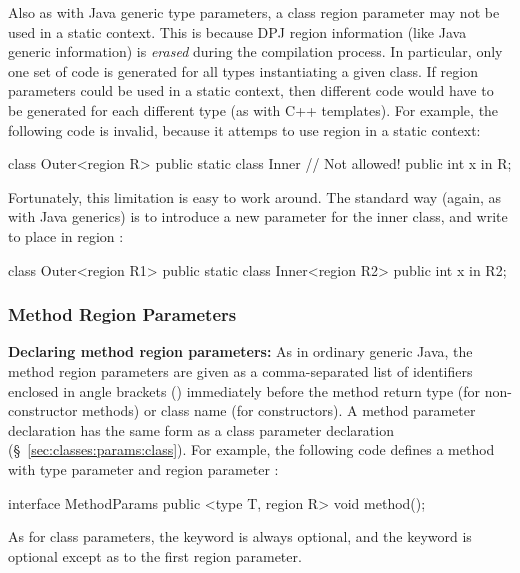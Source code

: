 Also as with Java generic type parameters, a class region parameter
may not be used in a static context.  This is because DPJ region
information (like Java generic information) is \emph{erased} during
the compilation process.  In particular, only one set of code is
generated for all types instantiating a given class.  If region
parameters could be used in a static context, then different code
would have to be generated for each different type (as with C++
templates).
%
For example, the following code is invalid, because it attemps to use
region  in a static context:
%
\begin{dpjlisting}
class Outer<region R> {
    public static class Inner {
        // Not allowed!
        public int x in R;
    }
}
\end{dpjlisting}

Fortunately, this limitation is easy to work around.  The standard way
(again, as with Java generics) is to introduce a new parameter for the
inner class, and write  to place  in region
:

\begin{dpjlisting}
class Outer<region R1> {
    public static class Inner<region R2> {
        public int x in R2;
    }
}
\end{dpjlisting}


\subsubsection{Method Region Parameters%
\label{sec:classes:params:method}}

\noindent
\textbf{Declaring method region parameters:} As in ordinary generic
Java, the method region parameters are given as a comma-separated list
of identifiers enclosed in angle brackets (\kwd{<>}) immediately
before the method return type (for non-constructor methods) or class
name (for constructors).  A method parameter declaration has the same
form as a class parameter declaration
(\S~\ref{sec:classes:params:class}).
%
For example, the following code defines a method with type parameter
 and region parameter :
%
\begin{dpjlisting}
interface MethodParams {
    public <type T, region R> void method();
}
\end{dpjlisting}
%
As for class parameters, the  keyword is always optional,
and the  keyword is optional except as to the first region
parameter.

